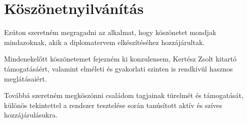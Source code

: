 \chapter*{Köszönetnyilvánítás}

Ezúton szeretném megragadni az alkalmat, hogy köszönetet mondjak mindazoknak, akik a diplomatervem elkészítéséhez hozzájárultak.

\bigskip

Mindenekelőtt köszönetemet fejezném ki konzulensem, Kertész Zsolt kitartó támogatásáért, valamint elméleti és gyakorlati szinten is rendkívül hasznos meglátásaiért.

Továbbá szeretném megköszönni családom tagjainak türelmét és támogatását, különös tekintettel a rendszer tesztelése során tanúsított aktív és szíves hozzájárulásukra.